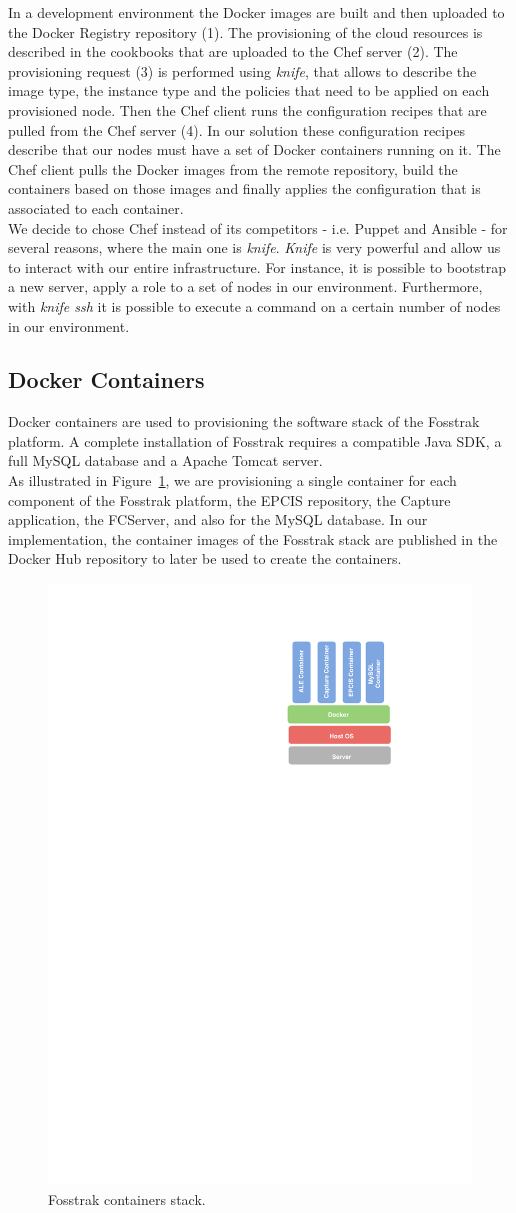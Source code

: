 In a development environment the Docker images are built and then uploaded to the Docker Registry
repository (1). The provisioning of the cloud resources is described in the cookbooks that are uploaded
to the Chef server (2). The provisioning request (3) is performed using \textit{knife}, that allows to
describe the image type, the instance type and the policies that need to be applied on each provisioned node.
Then the Chef client runs the configuration recipes that are pulled from the Chef server (4). In our
solution these configuration recipes describe that our nodes must have a set of Docker containers
running on it. The Chef client pulls the Docker images from the remote repository, build the containers
based on those images and finally applies the configuration that is associated to each container.\\

We decide to chose Chef instead of its competitors - i.e. Puppet and Ansible - for several
reasons, where the main one is \textit{knife}. \textit{Knife} is very powerful and allow us to
interact with our entire infrastructure. For instance, it is possible to bootstrap a new server,
apply a role to a set of nodes in our environment. Furthermore, with \textit{knife ssh} it is
possible to execute a command on a certain number of nodes in our environment.

\subsection{Docker Containers}
\label{sub:impl_docker}
Docker containers are used to provisioning the software stack of the Fosstrak platform. A complete
installation of Fosstrak requires a compatible Java \gls{SDK}, a full MySQL database and a Apache Tomcat
server.\\

As illustrated in Figure~\ref{fig:impl_containers}, we are provisioning a single container for each
component of the Fosstrak platform, the \gls{EPCIS} repository, the Capture application, the \gls{FCServer},
and also for the MySQL database. In our implementation, the container images of the Fosstrak stack
are published in the Docker Hub repository to later be used to create the containers.\\

\begin{figure}[!ht]
  \centering
  \includegraphics[width=.3\textwidth]{./images/docker-stack}
  \caption[Fosstrak containers stack.]{Fosstrak containers stack.}
  \label{fig:impl_containers}
\end{figure}

